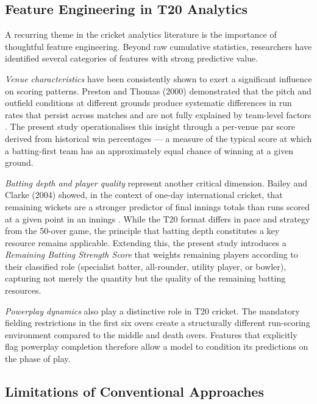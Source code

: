 \subsection{Feature Engineering in T20 Analytics}

A recurring theme in the cricket analytics literature is the importance of thoughtful feature engineering. Beyond raw cumulative statistics, researchers have identified several categories of features with strong predictive value.

\textit{Venue characteristics} have been consistently shown to exert a significant influence on scoring patterns. Preston and Thomas (2000) demonstrated that the pitch and outfield conditions at different grounds produce systematic differences in run rates that persist across matches and are not fully explained by team-level factors \cite{preston2000batting}. The present study operationalises this insight through a per-venue par score derived from historical win percentages --- a measure of the typical score at which a batting-first team has an approximately equal chance of winning at a given ground.

\textit{Batting depth and player quality} represent another critical dimension. Bailey and Clarke (2004) showed, in the context of one-day international cricket, that remaining wickets are a stronger predictor of final innings totals than runs scored at a given point in an innings \cite{bailey2004predicting}. While the T20 format differs in pace and strategy from the 50-over game, the principle that batting depth constitutes a key resource remains applicable. Extending this, the present study introduces a \textit{Remaining Batting Strength Score} that weights remaining players according to their classified role (specialist batter, all-rounder, utility player, or bowler), capturing not merely the quantity but the quality of the remaining batting resources.

\textit{Powerplay dynamics} also play a distinctive role in T20 cricket. The mandatory fielding restrictions in the first six overs create a structurally different run-scoring environment compared to the middle and death overs. Features that explicitly flag powerplay completion therefore allow a model to condition its predictions on the phase of play.

\subsection{Limitations of Conventional Approaches}

